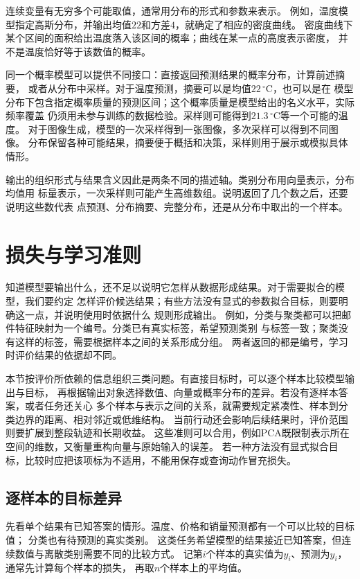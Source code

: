 连续变量有无穷多个可能取值，通常用分布的形式和参数来表示。
例如，温度模型指定高斯分布，并输出均值$22$和方差$4$，就确定了相应的密度曲线。
密度曲线下某个区间的面积给出温度落入该区间的概率；曲线在某一点的高度表示密度，
并不是温度恰好等于该数值的概率。

同一个概率模型可以提供不同接口：直接返回预测结果的概率分布，计算前述摘要，
或者从分布中采样。对于温度预测，摘要可以是均值$22\,^{\circ}\mathrm{C}$，也可以是在
模型分布下包含指定概率质量的预测区间；这个概率质量是模型给出的名义水平，实际频率覆盖
仍须用未参与训练的数据检验。采样则可能得到$21.3\,^{\circ}\mathrm{C}$等一个可能的温度。
对于图像生成，模型的一次采样得到一张图像，多次采样可以得到不同图像。
分布保留各种可能结果，摘要便于概括和决策，采样则用于展示或模拟具体情形。

输出的组织形式与结果含义因此是两条不同的描述轴。类别分布用向量表示，分布均值用
标量表示，一次采样则可能产生高维数组。说明返回了几个数之后，还要说明这些数代表
点预测、分布摘要、完整分布，还是从分布中取出的一个样本。

\section{损失与学习准则}
\label{sec:models-objectives}

知道模型要输出什么，还不足以说明它怎样从数据形成结果。对于需要拟合的模型，我们要约定
怎样评价候选结果；有些方法没有显式的参数拟合目标，则要明确这一点，并说明使用时依据什么
规则形成输出。
例如，分类与聚类都可以把邮件特征映射为一个编号。分类已有真实标签，希望预测类别
与标签一致；聚类没有这样的标签，需要根据样本之间的关系形成分组。
两者返回的都是编号，学习时评价结果的依据却不同。

本节按评价所依赖的信息组织三类问题。有直接目标时，可以逐个样本比较模型输出与目标，
再根据输出对象选择数值、向量或概率分布的差异。若没有逐样本答案，或者任务还关心
多个样本与表示之间的关系，就需要规定紧凑性、样本到分类边界的距离、相对邻近或低维结构。
当前行动还会影响后续结果时，评价范围则要扩展到整段轨迹和长期收益。
这些准则可以合用，例如PCA既限制表示所在空间的维数，又衡量重构向量与原始输入的误差。
若一种方法没有显式拟合目标，比较时应把该项标为不适用，不能用保存或查询动作冒充损失。

\subsection{逐样本的目标差异}
\label{sec:models-pointwise-objectives}

先看单个结果有已知答案的情形。温度、价格和销量预测都有一个可以比较的目标值；
分类也有待预测的真实类别。
这类任务希望模型的结果接近已知答案，但连续数值与离散类别需要不同的比较方式。
记第$i$个样本的真实值为$y_i$、预测为$\hat{y}_i$，通常先计算每个样本的损失，
再取$n$个样本上的平均值。

